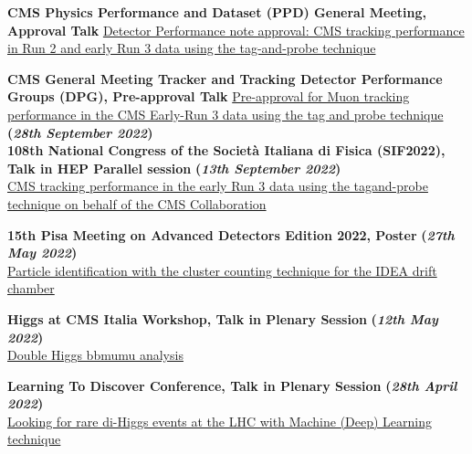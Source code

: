 \documentclass[11pt]{res}
\begin{document}
\begin{resume}
\textbf{CMS Physics Performance and Dataset (PPD) General Meeting, Approval Talk}
\href{https://indico.cern.ch/event/1210449/}{Detector Performance note approval: CMS tracking performance in Run 2 and early Run 3 data using the tag-and-probe technique}

\textbf{CMS General Meeting Tracker and Tracking Detector Performance Groups (DPG), Pre-approval Talk}
\href{https://indico.cern.ch/event/1190522/#9-pre-approval-for-offline-pri}{Pre-approval for Muon tracking performance in the CMS Early-Run 3 data using the tag and probe technique} \textbf{(\textit{28th September 2022})}\\

\textbf{108th National Congress of the Società Italiana di Fisica (SIF2022), Talk in HEP Parallel session} \textbf{(\textit{13th September 2022})}\\ 
\href{https://2022.congresso.sif.it/talk/580}{CMS tracking performance in the early Run 3 data using the tagand-probe technique on behalf of the CMS Collaboration}

\textbf{15th Pisa Meeting on Advanced Detectors Edition 2022, Poster} \textbf{(\textit{27th May 2022})}\\ 
\href{https://agenda.infn.it/event/22092/contributions/166630/}{Particle identification with the cluster counting technique for the IDEA drift chamber}

\textbf{Higgs at CMS Italia Workshop, Talk in Plenary Session} \textbf{(\textit{12th May 2022})}\\ 
\href{https://indico.cern.ch/event/1137095/}{Double Higgs bbmumu analysis}

\textbf{Learning To Discover Conference, Talk in Plenary Session} \textbf{(\textit{28th April 2022})}\\ 
\href{https://indico.ijclab.in2p3.fr/event/5999/contributions/25075/}{Looking for rare di-Higgs events at the LHC with Machine (Deep) Learning technique}


			

\end{resume}
\end{document}
